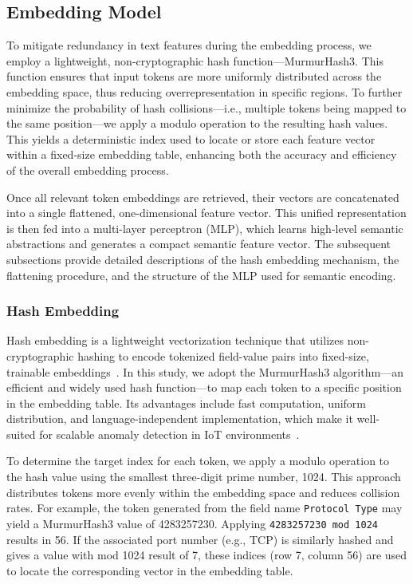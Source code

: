 \begin{ZhChapter}
\subsection{Embedding Model}
To mitigate redundancy in text features during the embedding process, we employ a lightweight, non-cryptographic hash function—MurmurHash3. This function ensures that input tokens are more uniformly distributed across the embedding space, thus reducing overrepresentation in specific regions. To further minimize the probability of hash collisions—i.e., multiple tokens being mapped to the same position—we apply a modulo operation to the resulting hash values. This yields a deterministic index used to locate or store each feature vector within a fixed-size embedding table, enhancing both the accuracy and efficiency of the overall embedding process.

Once all relevant token embeddings are retrieved, their vectors are concatenated into a single flattened, one-dimensional feature vector. This unified representation is then fed into a multi-layer perceptron (MLP), which learns high-level semantic abstractions and generates a compact semantic feature vector. The subsequent subsections provide detailed descriptions of the hash embedding mechanism, the flattening procedure, and the structure of the MLP used for semantic encoding.

\subsubsection{Hash Embedding}
Hash embedding is a lightweight vectorization technique that utilizes non-cryptographic hashing to encode tokenized field-value pairs into fixed-size, trainable embeddings~\cite{weinberger2009feature}. In this study, we adopt the MurmurHash3 algorithm—an efficient and widely used hash function—to map each token to a specific position in the embedding table. Its advantages include fast computation, uniform distribution, and language-independent implementation, which make it well-suited for scalable anomaly detection in IoT environments~\cite{appleby2011murmurhash}.

To determine the target index for each token, we apply a modulo operation to the hash value using the smallest three-digit prime number, 1024. This approach distributes tokens more evenly within the embedding space and reduces collision rates. For example, the token generated from the field name \texttt{Protocol Type} may yield a MurmurHash3 value of 4283257230. Applying \texttt{4283257230 mod 1024} results in 56. If the associated port number (e.g., TCP) is similarly hashed and gives a value with mod 1024 result of 7, these indices (row 7, column 56) are used to locate the corresponding vector in the embedding table.


\end{ZhChapter}
